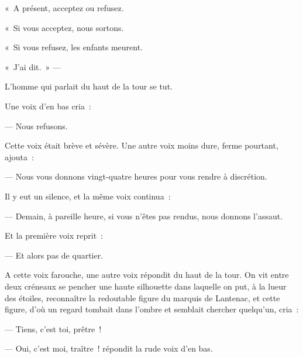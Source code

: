 \documentclass[french,twoside]{book} %
\begin{document}
« A présent, acceptez ou refusez.\par
« Si vous acceptez, nous sortons.\par
« Si vous refusez, les enfants meurent.\par
« J’ai dit. » — \par
L’homme qui parlait du haut de la tour se tut.\par
Une voix d’en bas cria :\par
— Nous refusons.\par
Cette voix était brève et sévère. Une autre voix moins dure, ferme pourtant, ajouta :\par
— Nous vous donnons vingt-quatre heures pour vous rendre à discrétion.\par
Il y eut un silence, et la même voix continua :\par
— Demain, à pareille heure, si vous n’êtes pas rendus, nous donnons l’assaut.\par
Et la première voix reprit :\par
— Et alors pas de quartier.\par
A cette voix farouche, une autre voix répondit du haut de la tour. On vit entre deux créneaux se pencher une haute silhouette dans laquelle on put, à la lueur des étoiles, reconnaître la redoutable figure du marquis de Lantenac, et cette figure, d’où un regard tombait dans l’ombre et semblait chercher quelqu’un, cria :\par
— Tiens, c’est toi, prêtre !\par
— Oui, c’est moi, traître ! répondit la rude voix d’en bas.
\end{document}
